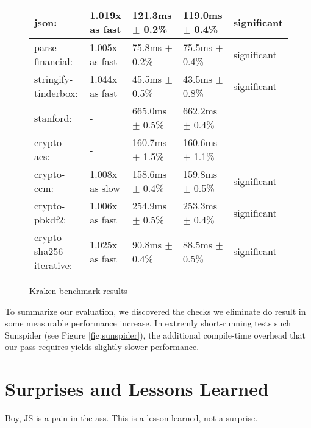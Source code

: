 \documentclass{article}
\begin{document}
\begin{figure}[H]
\begin{tabular}{|l|l|l|l|l|}
\hline\hline
      json:                     & 1.019x as fast   &  121.3ms $\pm$ 0.2\% &   119.0ms $\pm$ 0.4\%  &   significant\\
\hline\hspace{1em} parse-financial:        & 1.005x as fast   &   75.8ms $\pm$ 0.2\% &    75.5ms $\pm$ 0.4\%  &   significant\\
\hline\hspace{1em} stringify-tinderbox:    & 1.044x as fast   &   45.5ms $\pm$ 0.5\% &    43.5ms $\pm$ 0.8\%  &   significant\\
\hline\hline
      stanford:                 & -                &  665.0ms $\pm$ 0.5\% &   662.2ms $\pm$ 0.4\%  &\\
\hline\hspace{1em} crypto-aes:             & -                &  160.7ms $\pm$ 1.5\% &   160.6ms $\pm$ 1.1\%  &\\
\hline\hspace{1em} crypto-ccm:             & 1.008x as slow &  158.6ms $\pm$ 0.4\% &   159.8ms $\pm$ 0.5\%  &   significant\\
\hline\hspace{1em} crypto-pbkdf2:          & 1.006x as fast   &  254.9ms $\pm$ 0.5\% &   253.3ms $\pm$ 0.4\%  &   significant\\
\hline\hspace{1em} crypto-sha256-iterative:& 1.025x as fast   &   90.8ms $\pm$ 0.4\% &    88.5ms $\pm$ 0.5\%  &   significant \\
\hline
\end{tabular}
\caption{Kraken benchmark results}
\label{fig:kraken}
\end{figure}

To summarize our evaluation, we discovered the checks we eliminate do result in
some measurable performance increase. In extremly short-running tests such
Sunspider (see Figure \ref{fig:sunspider}), the additional compile-time
overhead that our pass requires yields slightly slower performance.


\section{Surprises and Lessons Learned}
Boy, JS is a pain in the ass.
This is a lesson learned, not a surprise.
\end{document}
